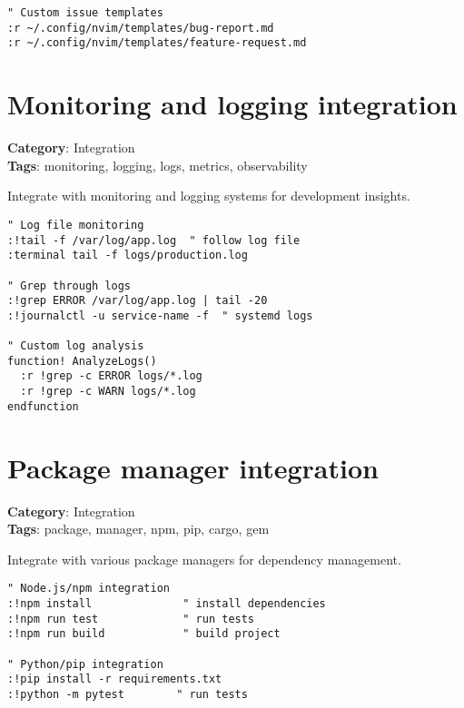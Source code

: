 {{{{{{\begin{Exa*}{}
\begin{Verbatim}[fontsize=\footnotesize, breaklines, breakanywhere]
" Custom issue templates
:r ~/.config/nvim/templates/bug-report.md
:r ~/.config/nvim/templates/feature-request.md
\end{Verbatim}
\end{Exa*}

\section{Monitoring and logging integration}

\textbf{Category}: Integration\\ \textbf{Tags}: monitoring, logging, logs, metrics, observability
\vspace{0.5cm}

Integrate with monitoring and logging systems for development insights.

\begin{Exa*}{}
\begin{Verbatim}[fontsize=\footnotesize, breaklines, breakanywhere]
" Log file monitoring
:!tail -f /var/log/app.log  " follow log file
:terminal tail -f logs/production.log

" Grep through logs
:!grep ERROR /var/log/app.log | tail -20
:!journalctl -u service-name -f  " systemd logs

" Custom log analysis
function! AnalyzeLogs()
  :r !grep -c ERROR logs/*.log
  :r !grep -c WARN logs/*.log
endfunction
\end{Verbatim}
\end{Exa*}

\section{Package manager integration}

\textbf{Category}: Integration\\ \textbf{Tags}: package, manager, npm, pip, cargo, gem
\vspace{0.5cm}

Integrate with various package managers for dependency management.

\begin{Exa*}{}
\begin{Verbatim}[fontsize=\footnotesize, breaklines, breakanywhere]
" Node.js/npm integration
:!npm install              " install dependencies
:!npm run test             " run tests
:!npm run build            " build project

" Python/pip integration
:!pip install -r requirements.txt
:!python -m pytest        " run tests


\end{Verbatim}
\end{Exa*}}}}}}}
